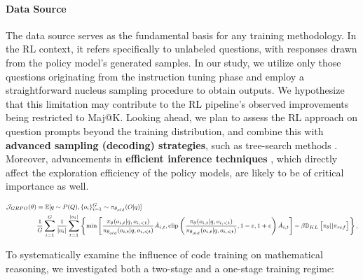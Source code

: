 \begin{itemize}[topsep=0pt]
\begin{itemize}[topsep=0pt]
\paragraph{Data Source} The data source serves as the fundamental basis for any training methodology. In the RL context, it refers specifically to unlabeled questions, with responses drawn from the policy model’s generated samples. In our study, we utilize only those questions originating from the instruction tuning phase and employ a straightforward nucleus sampling procedure to obtain outputs. We hypothesize that this limitation may contribute to the RL pipeline’s observed improvements being restricted to Maj@K. Looking ahead, we plan to assess the RL approach on question prompts beyond the training distribution, and combine this with \textbf{advanced sampling (decoding) strategies}, such as tree-search methods \citep{yao2023tree}. Moreover, advancements in \textbf{efficient inference techniques} \citep{xia-etal-2023-speculative,leviathan2023fast,kwon2023efficient,xia2024unlocking}, which directly affect the exploration efficiency of the policy models, are likely to be of critical importance as well.

\begin{equation}
\footnotesize
\begin{split}
    \mathcal{J}_{GRPO}(\theta) &= \mathbb{E}{[q \sim P(Q), \{o_i\}_{i=1}^G \sim \pi_{\theta_{old}}(O|q)]}  \\
    & \frac{1}{G}\sum_{i=1}^G\frac{1}{|o_i|} \sum_{t=1}^{|o_i|} \left\{ \min \left[ \frac{\pi_\theta(o_{i,t} | q, o_{i,<t})}{\pi_{\theta_{old}}(o_{i,t} | q, o_{i,<t})} \hat{A}_{i,t}, \text{clip} \left( \frac{\pi_\theta(o_{i,t} | q, o_{i,<t})}{\pi_{\theta_{old}}(o_{i,t} | q, o_{i,<t})}, 1 - \varepsilon, 1 + \varepsilon \right)  \hat{A}_{i,t} \right] - \beta \mathbb{D}_{KL}\left[\pi_{\theta} || \pi_{ref}\right]\right\} ,
\end{split}
\label{eq:GRPO-obj}
\end{equation}

To systematically examine the influence of code training on mathematical reasoning, we investigated both a two-stage and a one-stage training regime:


\end{itemize}
\end{itemize}

